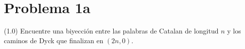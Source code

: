 \section*{Problema 1a}
(1.0) Encuentre una biyección entre las palabras de Catalan de longitud $n$ y los caminos de Dyck que finalizan en $(2n,0)$.
